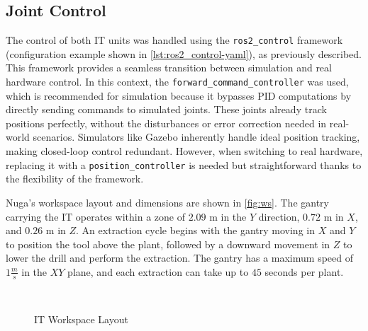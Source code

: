 \subsection{Joint Control}
The control of both \ac{IT} units was handled using the \texttt{ros2\_control} framework (configuration example shown in \autoref{lst:ros2_control-yaml}), as previously described. This framework provides a seamless transition between simulation and real hardware control. In this context, the \texttt{forward\_command\_controller} was used, which is recommended for simulation because it bypasses PID computations by directly sending commands to simulated joints. These joints already track positions perfectly, without the disturbances or error correction needed in real-world scenarios. Simulators like Gazebo inherently handle ideal position tracking, making closed-loop control redundant. However, when switching to real hardware, replacing it with a \texttt{position\_controller} is needed but straightforward thanks to the flexibility of the framework.

Nuga's workspace layout and dimensions are shown in \autoref{fig:ws}. The gantry carrying the \ac{IT} operates within a zone of $2.09$ m in the $Y$ direction, $0.72$ m in $X$, and $0.26$ m in $Z$. An extraction cycle begins with the gantry moving in $X$ and $Y$ to position the tool above the plant, followed by a downward movement in $Z$ to lower the drill and perform the extraction. The gantry has a maximum speed of $1\frac{m}{s}$ in the $XY$ plane, and each extraction can take up to $45$ seconds per plant. 

\begin{figure}[t]
    \myfloatalign
     \quad
     \\
    \caption{\ac{IT} Workspace Layout}\label{fig:ws}
\end{figure}

